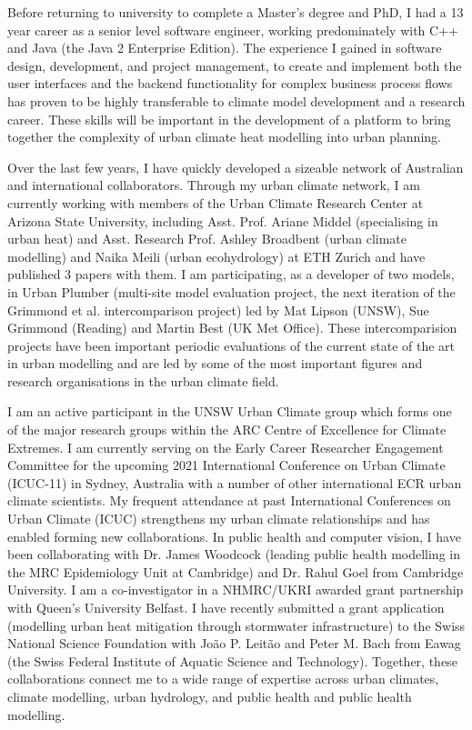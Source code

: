 Before returning to university to complete a Master’s degree and PhD, I had a 13 year career as a senior level software engineer, working predominately with C++ and Java (the Java 2 Enterprise Edition). The experience I gained in software design, development, and project management, to create and implement both the user interfaces and the backend functionality for complex business process flows has proven to be highly transferable to climate model development and a research career. These skills will be important in the development of a platform to bring together the complexity of urban climate heat modelling into urban planning.

Over the last few years, I have quickly developed a sizeable network of Australian and international collaborators. Through my urban climate network, I am currently working with members of the Urban Climate Research Center at Arizona State University, including Asst. Prof. Ariane Middel (specialising in urban heat) and Asst. Research Prof. Ashley Broadbent (urban climate modelling) and Naika Meili (urban ecohydrology) at ETH Zurich and have published 3 papers with them. I am participating, as a developer of two models, in Urban Plumber (multi-site model evaluation project, the next iteration of the Grimmond et al.\cite{Grimmond2011} intercomparison project) led by Mat Lipson (UNSW), Sue Grimmond (Reading) and Martin Best (UK Met Office). These intercomparision projects have been important periodic evaluations of the current state of the art in urban modelling and are led by some of the most important figures and research organisations in the urban climate field. 

I am an active participant in the UNSW Urban Climate group which forms one of the major research groups within the ARC Centre of Excellence for Climate Extremes. I am currently serving on the Early Career Researcher Engagement Committee for the upcoming 2021 International Conference on Urban Climate (ICUC-11) in Sydney, Australia with a number of other international ECR urban climate scientists. My frequent attendance at past International Conferences on Urban Climate (ICUC) strengthens my urban climate relationships and has enabled forming new collaborations. In public health and computer vision, I have been collaborating with Dr. James Woodcock (leading public health modelling in the MRC Epidemiology Unit at Cambridge) and Dr. Rahul Goel from Cambridge University. I am a co-investigator in a NHMRC/UKRI awarded grant partnership with Queen’s University Belfast. I have recently submitted a grant application (modelling urban heat mitigation through stormwater infrastructure) to the Swiss National Science Foundation with Jo\~{a}o P. Leit\~{a}o and Peter M. Bach from Eawag (the Swiss Federal Institute of Aquatic Science and Technology). Together, these collaborations connect me to a wide range of expertise across urban climates, climate modelling, urban hydrology, and public health and public health modelling.

